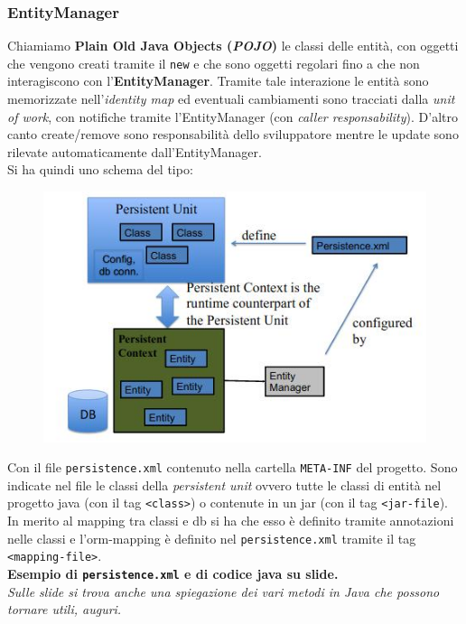 \documentclass[a4paper,12pt, oneside]{book}
\begin{document}
\subsubsection{EntityManager}
Chiamiamo \textbf{Plain Old Java Objects (\textit{POJO})} le classi delle
entità, con oggetti che vengono creati tramite il \texttt{new} e che sono
oggetti regolari fino a che non interagiscono con
l'\textbf{EntityManager}. Tramite tale interazione le entità sono memorizzate
nell'\textit{identity map} ed eventuali cambiamenti sono tracciati dalla
\textit{unit of work}, con notifiche tramite l'EntityManager (con \textit{caller
  responsability}).  D'altro canto create/remove sono responsabilità dello
sviluppatore mentre le update sono rilevate automaticamente
dall'EntityManager.\\
Si ha quindi uno schema del tipo:
\begin{figure}[H]
  \centering
  \includegraphics[scale = 0.57]{img/em.jpg}
\end{figure}
Con il file \texttt{persistence.xml} contenuto nella cartella \texttt{META-INF}
del progetto. Sono indicate nel file le classi della \textit{persistent unit}
ovvero tutte le classi di entità nel progetto java (con il tag \texttt{<class>})
o contenute in un jar (con il tag \texttt{<jar-file}).\\
In merito al mapping tra classi e db si ha che esso è definito tramite
annotazioni nelle classi e l'orm-mapping è definito nel
\texttt{persistence.xml} tramite il tag \texttt{<mapping-file>}.\\
\textbf{Esempio di \texttt{persistence.xml} e di codice java su slide.}\\
\textit{Sulle slide si trova anche una spiegazione dei vari metodi in Java che
  possono tornare utili, auguri.}
\end{document}
